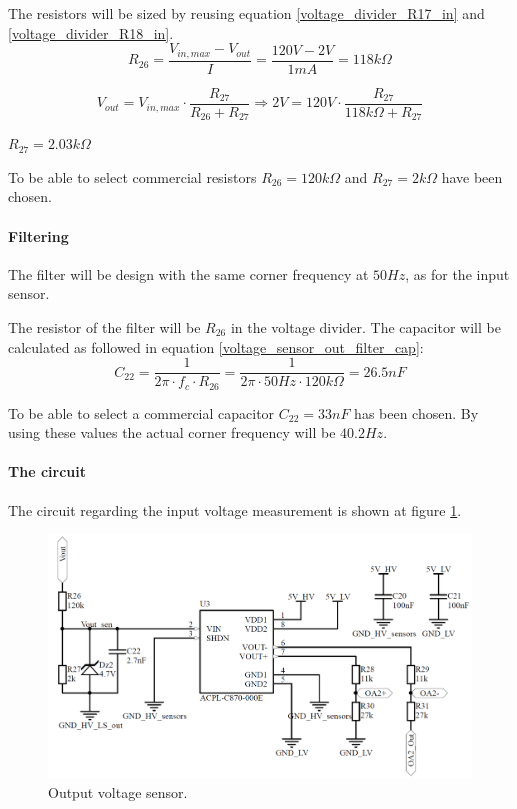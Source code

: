\noindent The resistors will be sized by reusing equation \ref{voltage_divider_R17_in} and \ref{voltage_divider_R18_in}.
\begin{equation}
	R_{26} = \frac{V_{in,max}-V_{out}}{I} = \frac{120V-2V}{1mA} = 118k\Omega	
\end{equation}

\begin{equation} 
	V_{out} = V_{in,max} \cdot \frac{R_{27}}{R_{26}+R_{27}} \Rightarrow 2V = 120V \cdot \frac{R_{27}}{118k\Omega+R_{27}}
\end{equation}
\begin{center}
	$R_{27} = 2.03k\Omega$
\end{center}

\noindent To be able to select commercial resistors $R_{26} = 120k\Omega$ and $R_{27} = 2k\Omega$ have been chosen. 

\paragraph{Filtering}
The filter will be design with the same corner frequency at $50Hz$, as for the input sensor.

The resistor of the filter will be $R_{26}$ in the voltage divider. The capacitor will be calculated as followed in equation \ref{voltage_sensor_out_filter_cap}:
\begin{equation} \label{voltage_sensor_out_filter_cap}
	C_{22} = \frac{1}{2\pi \cdot f_c \cdot R_{26}} = \frac{1}{2 \pi \cdot 50Hz \cdot 120k\Omega} = 26.5nF
\end{equation}

To be able to select a commercial capacitor $C_{22} = 33nF$ has been chosen. By using these values the actual corner frequency will be $40.2 Hz$.

\paragraph{The circuit}
The circuit regarding the input voltage measurement is shown at figure \ref{fig:output_voltage_sensor_circuit}. 

\begin{figure}[H]
	\begin{center}
		\includegraphics[width=0.8\linewidth]{../Pictures/P1/Sensors/output_voltage_sensor.PNG}
		\caption{Output voltage sensor.}
		\label{fig:output_voltage_sensor_circuit}
	\end{center}
\end{figure}

